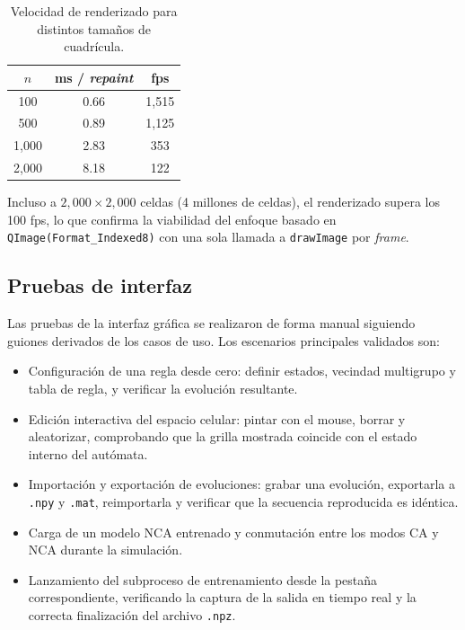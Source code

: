 \begin{table}[H]
    \centering
    \begin{tabular}{c|c|c}
        \hline
        $n$ & ms / \textit{repaint} & fps \\ \hline
        100  & 0.66 & 1,515 \\ \hline
        500  & 0.89 & 1,125 \\ \hline
        1,000 & 2.83 &  353 \\ \hline
        2,000 & 8.18 &  122 \\ \hline
    \end{tabular}
    \caption{Velocidad de renderizado para distintos tamaños de cuadrícula.}
    \label{tab:perf-render}
\end{table}

Incluso a $2{,}000 \times 2{,}000$ celdas (4 millones de celdas), el renderizado supera los 100 fps, lo que confirma la viabilidad del enfoque basado en \texttt{QImage(Format\_Indexed8)} con una sola llamada a \texttt{drawImage} por \textit{frame}.

\subsection{Pruebas de interfaz}

Las pruebas de la interfaz gráfica se realizaron de forma manual siguiendo guiones derivados de los casos de uso. Los escenarios principales validados son:

\begin{itemize}
    \item Configuración de una regla desde cero: definir estados, vecindad multigrupo y tabla de regla, y verificar la evolución resultante.
    \item Edición interactiva del espacio celular: pintar con el mouse, borrar y aleatorizar, comprobando que la grilla mostrada coincide con el estado interno del autómata.
    \item Importación y exportación de evoluciones: grabar una evolución, exportarla a \texttt{.npy} y \texttt{.mat}, reimportarla y verificar que la secuencia reproducida es idéntica.
    \item Carga de un modelo NCA entrenado y conmutación entre los modos CA y NCA durante la simulación.
    \item Lanzamiento del subproceso de entrenamiento desde la pestaña correspondiente, verificando la captura de la salida en tiempo real y la correcta finalización del archivo \texttt{.npz}.
\end{itemize}

